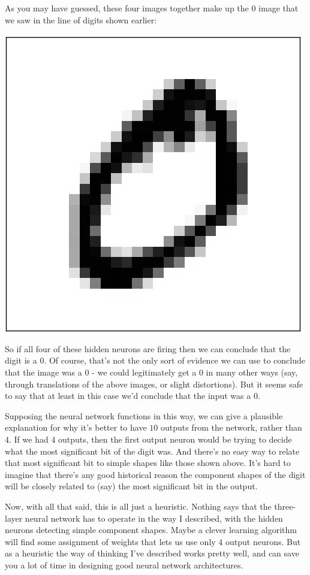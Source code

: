 \documentclass[a4paper,12pt]{report}%
\begin{document}
As you may have guessed, these four images together make up the $0$ image that we saw in the line of digits shown earlier:
\begin{center}
 \includegraphics[width=0.15\linewidth]{images/mnist_complete_zero.png}
\end{center}

So if all four of these hidden neurons are firing then we can conclude that the digit is a $0$. Of course, that's not the only sort of evidence we can use to conclude that the image was a $0$ - we could legitimately get a $0$ in many other ways (say, through translations of the above images, or slight distortions). But it seems safe to say that at least in this case we'd conclude that the input was a $0$.

Supposing the neural network functions in this way, we can give a plausible explanation for why it's better to have $10$ outputs from the network, rather than $4$. If we had $4$ outputs, then the first output neuron would be trying to decide what the most significant bit of the digit was. And there's no easy way to relate that most significant bit to simple shapes like those shown above. It's hard to imagine that there's any good historical reason the component shapes of the digit will be closely related to (say) the most significant bit in the output.

Now, with all that said, this is all just a heuristic. Nothing says that the three-layer neural network has to operate in the way I described, with the hidden neurons detecting simple component shapes. Maybe a clever learning algorithm will find some assignment of weights that lets us use only $4$ output neurons. But as a heuristic the way of thinking I've described works pretty well, and can save you a lot of time in designing good neural network  architectures.
\end{document}

